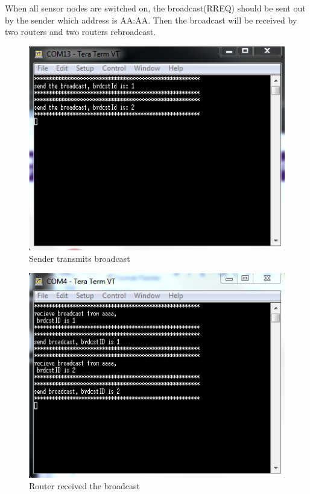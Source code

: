 \documentclass[a4paper]{article}
\begin{document}
When all sensor nodes are switched on, the broadcast(RREQ) should be sent out by the sender which address is AA:AA. Then the broadcast will be received by two routers and two routers rebroadcast.

\begin{figure}[!htb]
   \centering
   \includegraphics[scale=0.7]{test1}
	\begin{center}
	   \caption{Sender transmits broadcast}
	\end{center}	   
    \label{fig:test1}
\end{figure}

\begin{figure}[!htb]
   \centering
   \includegraphics[scale=0.7]{test2}
	\begin{center}
	   \caption{Router received the broadcast}
	\end{center}	   
    \label{fig:test2}
\end{figure}
\end{document}
